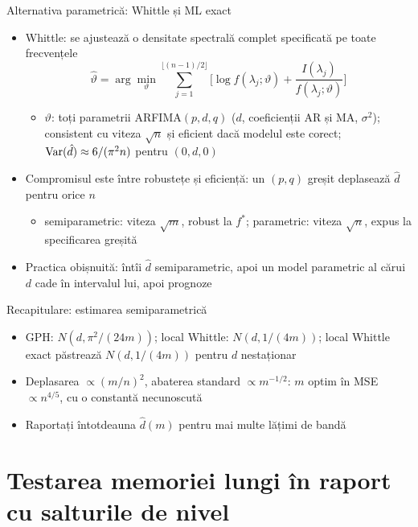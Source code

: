 \begin{frame}{Alternativa parametrică: Whittle și ML exact}
\itemsize{\small}
\begin{itemize}
    \item Whittle: se ajustează o densitate spectrală complet specificată pe toate frecvențele 
    \[ \hat\vartheta = \arg\min_\vartheta\sum_{j=1}^{\lfloor (n-1)/2\rfloor}\Big[\log f(\lambda_j; \vartheta) + \frac{I(\lambda_j)}{f(\lambda_j; \vartheta)}\Big] \]
    \begin{itemize}
        \item $\vartheta$: toți parametrii ARFIMA$(p,d,q)$ ($d$, coeficienții AR și MA, $\sigma^2$); consistent cu viteza $\sqrt n$ și eficient dacă modelul este corect; $\text{Var}(\hat d) \approx 6/(\pi^2n)$ pentru $(0,d,0)$
    \end{itemize}
    \item Compromisul este între robustețe și eficiență: un $(p, q)$ greșit deplasează $\hat d$ pentru orice $n$
    \begin{itemize}
        \item semiparametric: viteza $\sqrt m$, robust la $f^*$; parametric: viteza $\sqrt n$, expus la specificarea greșită
    \end{itemize}
    \item Practica obișnuită: întîi $\hat d$ semiparametric, apoi un model parametric al cărui $d$ cade în intervalul lui, apoi prognoze
\end{itemize}
\end{frame}

\begin{frame}{Recapitulare: estimarea semiparametrică}
\itemsize{\small}
\begin{itemize}
    \item GPH: $N(d, \pi^2/(24m))$; local Whittle: $N(d, 1/(4m))$; local Whittle exact păstrează $N(d, 1/(4m))$ pentru $d$ nestaționar
    \item Deplasarea $\propto (m/n)^2$, abaterea standard $\propto m^{-1/2}$: $m$ optim în MSE $\propto n^{4/5}$, cu o constantă necunoscută
    \item Raportați întotdeauna $\hat d(m)$ pentru mai multe lățimi de bandă
\end{itemize}
\end{frame}


\section{Testarea memoriei lungi în raport cu salturile de nivel}

